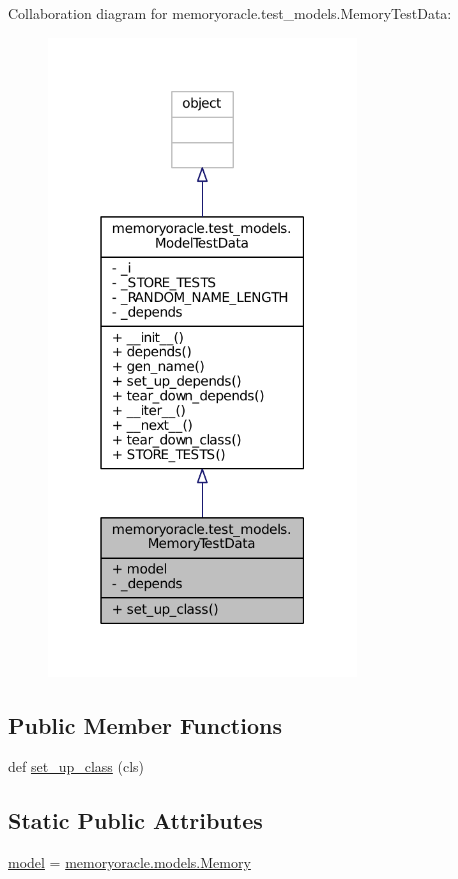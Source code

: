 Collaboration diagram for memoryoracle.\+test\+\_\+models.\+Memory\+Test\+Data\+:\nopagebreak
\begin{figure}[H]
\begin{center}
\leavevmode
\includegraphics[width=232pt]{classmemoryoracle_1_1test__models_1_1MemoryTestData__coll__graph}
\end{center}
\end{figure}
\subsection*{Public Member Functions}
\begin{DoxyCompactItemize}
\item 
def \hyperlink{classmemoryoracle_1_1test__models_1_1MemoryTestData_a20a34b92eed5df20347ac179810d1714}{set\+\_\+up\+\_\+class} (cls)
\end{DoxyCompactItemize}
\subsection*{Static Public Attributes}
\begin{DoxyCompactItemize}
\item 
\hyperlink{classmemoryoracle_1_1test__models_1_1MemoryTestData_a39f9d2a45b4f7cd7bb7884623add7f66}{model} = \hyperlink{classmemoryoracle_1_1models_1_1Memory}{memoryoracle.\+models.\+Memory}
\end{DoxyCompactItemize}
